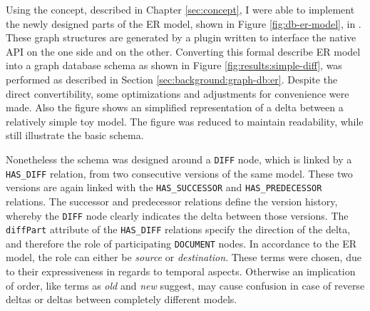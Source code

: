 
Using the concept, described in Chapter \ref{sec:concept}, I were able to implement the newly designed parts of the ER model, shown in Figure \ref{fig:db-er-model}, in \neoj. These graph structures are generated by a plugin written to interface the native \neoj API on the one side and \bives on the other.
Converting this formal describe ER model into a graph database schema as shown in Figure \ref{fig:results:simple-diff}, was performed as described in Section \ref{sec:background:graph-db:er}. Despite the direct convertibility, some optimizations and adjustments for convenience were made.
Also the figure shows an simplified representation of a delta between a relatively simple toy model. The figure was reduced to maintain readability, while still illustrate the basic schema.

Nonetheless the schema was designed around a \texttt{DIFF} node, which is linked by a \texttt{HAS\_DIFF} relation, from two consecutive versions of the same model. These two versions are again linked with the \texttt{HAS\_SUCCESSOR} and \texttt{HAS\_PREDECESSOR} relations.
The successor and predecessor relations define the version history, whereby the \texttt{DIFF} node clearly indicates the delta between those versions. The \texttt{diffPart} attribute of the \texttt{HAS\_DIFF} relations specify the direction of the delta, and therefore the role of participating \texttt{DOCUMENT} nodes. In accordance to the ER model, the role can either be \emph{source} or \emph{destination}.
These terms were chosen, due to their expressiveness in regards to temporal aspects. Otherwise an implication of order, like terms as \emph{old} and \emph{new} suggest, may cause confusion in case of reverse deltas or deltas between completely different models.

